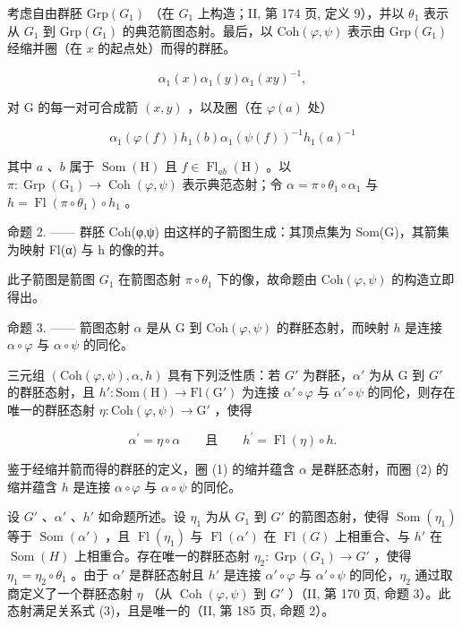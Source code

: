 考虑自由群胚 \(\mathrm{Grp}(G_{1})\) （在 \(G_{1}\) 上构造；II, 第 174 页, 定义 9），并以 \(\theta_{1}\) 表示从 \(G_{1}\) 到 \(\mathrm{Grp}(G_{1})\) 的典范箭图态射。最后，以 \(\mathrm{Coh}(\varphi,\psi)\) 表示由 \(\mathrm{Grp}(G_{1})\) 经缩并圈（在 \(x\) 的起点处）而得的群胚。

\[
\alpha_ {1} (x) \alpha_ {1} (y) \alpha_ {1} (x y) ^ {- 1},\tag{1}
\]

对 G 的每一对可合成箭 \((x,y)\) ，以及圈（在 \(\varphi(a)\) 处）

\[
\alpha_ {1} (\varphi (f)) h _ {1} (b) \alpha_ {1} (\psi (f)) ^ {- 1} h _ {1} (a) ^ {- 1}\tag{2}
\]

其中 \(a\) 、\(b\) 属于 \(\operatorname{Som}(\mathrm{H})\) 且 \(f \in \operatorname{Fl}_{ab}(\mathrm{H})\) 。以 \(\pi: \operatorname{Grp}(\mathrm{G}_1) \to \operatorname{Coh}(\varphi, \psi)\) 表示典范态射；令 \(\alpha = \pi \circ \theta_1 \circ \alpha_1\) 与 \(h = \operatorname{Fl}(\pi \circ \theta_1) \circ h_1\) 。

命题 2. —— 群胚 Coh(φ,ψ) 由这样的子箭图生成：其顶点集为 Som(G)，其箭集为映射 Fl(α) 与 h 的像的并。

此子箭图是箭图 \(G_{1}\) 在箭图态射 \(\pi \circ \theta_{1}\) 下的像，故命题由 \(\mathrm{Coh}(\varphi, \psi)\) 的构造立即得出。

命题 3. —— 箭图态射 \(\alpha\) 是从 G 到 \(\mathrm{Coh}(\varphi, \psi)\) 的群胚态射，而映射 \(h\) 是连接 \(\alpha \circ \varphi\) 与 \(\alpha \circ \psi\) 的同伦。

三元组 \((\mathrm{Coh}(\varphi,\psi),\alpha,h)\) 具有下列泛性质：若 \(G'\) 为群胚，\(\alpha'\) 为从 G 到 \(G'\) 的群胚态射，且 \(h'\colon\mathrm{Som}(\mathrm{H})\to\mathrm{Fl}(\mathrm{G}')\) 为连接 \(\alpha'\circ\varphi\) 与 \(\alpha'\circ\psi\) 的同伦，则存在唯一的群胚态射 \(\eta\colon\mathrm{Coh}(\varphi,\psi)\to\mathrm{G}'\) ，使得

\[
\alpha^ {\prime} = \eta \circ \alpha \qquad\text{且}\qquad h ^ {\prime} = \operatorname{Fl} (\eta) \circ h.\tag{3}
\]

鉴于经缩并箭而得的群胚的定义，圈 (1) 的缩并蕴含 \(\alpha\) 是群胚态射，而圈 (2) 的缩并蕴含 \(h\) 是连接 \(\alpha \circ \varphi\) 与 \(\alpha \circ \psi\) 的同伦。

设 \(G'\) 、\(\alpha'\) 、\(h'\) 如命题所述。设 \(\eta_{1}\) 为从 \(G_{1}\) 到 \(G'\) 的箭图态射，使得 \(\operatorname{Som}(\eta_{1})\) 等于 \(\operatorname{Som}(\alpha')\) ，且 \(\operatorname{Fl}(\eta_{1})\) 与 \(\operatorname{Fl}(\alpha')\) 在 \(\operatorname{Fl}(G)\) 上相重合、与 \(h'\) 在 \(\operatorname{Som}(H)\) 上相重合。存在唯一的群胚态射 \(\eta_{2}: \operatorname{Grp}(G_{1}) \to G'\) ，使得 \(\eta_{1} = \eta_{2} \circ \theta_{1}\) 。由于 \(\alpha'\) 是群胚态射且 \(h'\) 是连接 \(\alpha' \circ \varphi\) 与 \(\alpha' \circ \psi\) 的同伦，\(\eta_{2}\) 通过取商定义了一个群胚态射 \(\eta\) （从 \(\operatorname{Coh}(\varphi, \psi)\) 到 \(G'\) ）（II, 第 170 页, 命题 3）。此态射满足关系式 (3)，且是唯一的（II, 第 185 页, 命题 2）。

